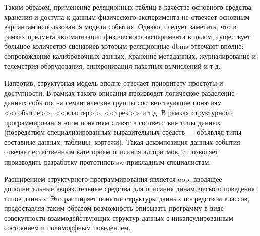 Таким образом, применение реляционных таблиц в качестве основного средства
хранения и доступа к данным физического эксперимента не отвечает
основным вариантам использования модели события. Однако, следует
заметить, что в рамках предмета автоматизации физического эксперимента в
целом, существует большое количество сценариев которым
реляционные \acrshort{dbms} отвечают вполне: сопровождение калибровочных данных,
хранение метаданных, журналирование и телеметрия оборудования,
синхронизация пакетных вычислений и т.д.

Напротив, структурная модель вполне отвечает приоритету
простоты и доступности. В рамках такого
описания производят логическое разделение данных события на
семантические группы соответствующие понятиям <<событие>>,
<<кластер>>, <<трек>> и т.д. В рамках структурного
программирования этим понятиям ставят в соответствие
типы данных (посредством специализированных выразительных
средств --- объявляя типы составные данных, таблицы, кортежи).
Такая декомпозиция данных события
отвечает естественным категориям описания алгоритмов, и позволяет
производить разработку прототипов \acrshort{sw} прикладным специалистам.

Расширением структурного программирования является \acrshort{oop}, вводящее
дополнительные выразительные средства для описания динамического
поведения типов данных. Это расширяет понятие структуры данных
посредством классов, предоставляя таким образом
возможность описывать программу в виде совокупности взаимодействующих
структур данных с инкапсулированным состоянием и полиморфным
поведением.

%

